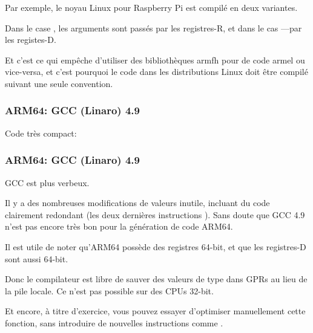 Par exemple, le noyau Linux pour Raspberry Pi est compilé en deux variantes.

Dans le case , les arguments sont passés par les registres-R, et dans
le cas ---par les registes-D.

Et c'est ce qui empêche d'utiliser des bibliothèques armfh pour de code armel ou
vice-versa, et c'est pourquoi le code dans les distributions Linux doit être compilé
suivant une seule convention.
\fi

\subsubsection{ARM64: GCC \Optimizing (Linaro) 4.9}

Code très compact:



\subsubsection{ARM64: GCC \NonOptimizing (Linaro) 4.9}



GCC \NonOptimizing est plus verbeux.

Il y a des nombreuses modifications de valeurs inutile, incluant du code clairement
redondant (les deux dernières instructions ). Sans doute que GCC 4.9 n'est
pas encore très bon pour la génération de code ARM64.

Il est utile de noter qu'ARM64 possède des registres 64-bit, et que les registres-D
sont aussi 64-bit.

Donc le compilateur est libre de sauver des valeurs de type \Tdouble dans \ac{GPR}s
au lieu de la pile locale.
Ce n'est pas possible sur des CPUs 32-bit.

Et encore, à titre d'exercice, vous pouvez essayer d'optimiser manuellement cette
fonction, sans introduire de nouvelles instructions comme .
